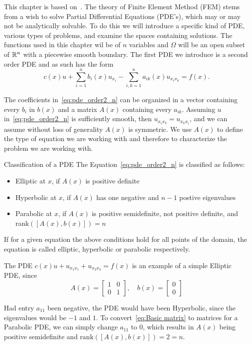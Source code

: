 This chapter is based on~\cite{Braess}.
The theory of Finite Element Method (FEM) stems from a 
wish to solve Partial Differential Equations (PDE's),
which may or may not be analytically solvable. 
To do this we will introduce a specific kind of PDE, 
various types of 
problems, and examine the spaces containing solutions. 
The functions used in this chapter wil be of $n$ 
variables and $\Omega$ will be 
an open subset of $\mathbb{R}^n$ with a piecewise smooth boundary.
The first PDE we introduce is a second order PDE and as 
such has the form
\begin{equation}
	 c(x) u + \sum_{i=1}^{n}b_i(x)u_{x_{i}}
	- \sum_{i,k=1}^{n}a_{ik}(x)u_{x_i x_k}\label{eq:pde_order2_n}
	= f(x).
\end{equation}

The coefficients in~\eqref{eq:pde_order2_n} can be 
organized in a vector containing every $b_i$ 
in $b(x)$
and a matrix $A(x)$ containing every $a_{ik}$.
Assuming $u$ in~\eqref{eq:pde_order2_n} is sufficiently 
smooth, then $u_{x_i x_k} =u_{x_k x_i} $, and we can 
assume without loss of generality $A(x)$ is 
symmetric. %
We use $A(x)$ to define the type of equation we are working 
with and therefore to characterize the problem we are 
working with.
\begin{defn}{Classification of a PDE}
	The Equation~\eqref{eq:pde_order2_n} is classified as follows:
	\begin{itemize}
		\item Elliptic at $x$, if $A(x)$ is positive definite
		\item Hyperbolic at $x$, if $A(x)$ has one negative and $n-1$ postive eigenvalues
		\item Parabolic at $x$, if $A(x)$ is positive semidefinite, not positive definite, and rank$([A(x), b(x)])=n$
	\end{itemize}
	If for a given equation the above conditions hold for all points of the domain, the equation is called elliptic, hyperbolic or parabolic respectively.\label{def:pde_classification}
\end{defn}


\begin{exmp}{\quad}
The PDE $c(x)u + u_{x_1x_1} + u_{x_2x_2} = f(x)$ is an example of a simple Elliptic PDE, since
\begin{equation}\label{eq:Basic matrix}
	A(x) = \begin{bmatrix}
		1 & 0\\
		0 & 1
	\end{bmatrix}, \quad
	b(x) = \begin{bmatrix}
		0\\
		0
	\end{bmatrix}
\end{equation}

Had entry $a_{11}$ been negative, the PDE would have been Hyperbolic, since the eigenvalues would be $-1$ and $1$. To convert~\eqref{eq:Basic matrix} to matrices for a Parabolic PDE, we can simply change $a_{11}$ to $0$, which results in $A(x)$ being positive semidefinite and $\text{rank}([A(x), b(x)]) = 2 = n$.
\end{exmp}
	


